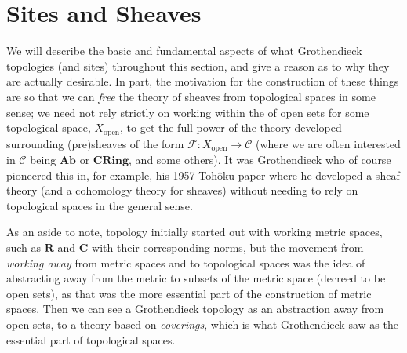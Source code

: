 \documentclass[oneside]{amsart}
\theoremstyle{definition}
\newcommand{\rr}{\mathbf R}
\newcommand{\cc}{\mathbf C}
\begin{document}
\section{Sites and Sheaves}


We will describe the basic and fundamental aspects of what Grothendieck topologies (and sites) throughout this section, and give a reason as to why they are actually desirable. In part, the motivation for the construction of these things are so that we can \textit{free} the theory of sheaves from topological spaces in some sense; we need not rely strictly on working within the of open sets for some topological space, $X_{\text{open}}$, to get the full power of the theory developed surrounding (pre)sheaves of the form $\mathscr F \colon X_{\text{open}} \to \mathscr C$ (where we are often interested in $\mathscr C$ being $\mathbf{Ab}$ or $\mathbf{CRing}$, and some others). It was Grothendieck who of course pioneered this in, for example, his 1957 Toh\^oku paper where he developed a sheaf theory (and a cohomology theory for sheaves) without needing to rely on topological spaces in the general sense. 

As an aside to note, topology initially started out with working metric spaces, such as $\rr$ and $\cc$ with their corresponding norms, but the movement from \textit{working away} from metric spaces and to topological spaces was the idea of abstracting away from the metric to subsets of the metric space (decreed to be open sets), as that was the more essential part of the construction of metric spaces. Then we can see a Grothendieck topology as an abstraction away from open sets, to a theory based on \textit{coverings}, which is what Grothendieck saw as the essential part of topological spaces.
\end{document}
